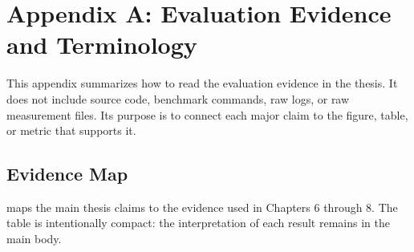\chapter*{Appendix A: Evaluation Evidence and Terminology}
\setcounter{chapter}{1}
\setcounter{section}{0}
\setcounter{table}{0}

This appendix summarizes how to read the evaluation evidence in the thesis. It
does not include source code, benchmark commands, raw logs, or raw measurement
files. Its purpose is to connect each major claim to the figure, table, or
metric that supports it.

\section{Evidence Map}

 maps the main thesis claims to the evidence
used in Chapters 6 through 8. The table is intentionally compact: the
interpretation of each result remains in the main body.


